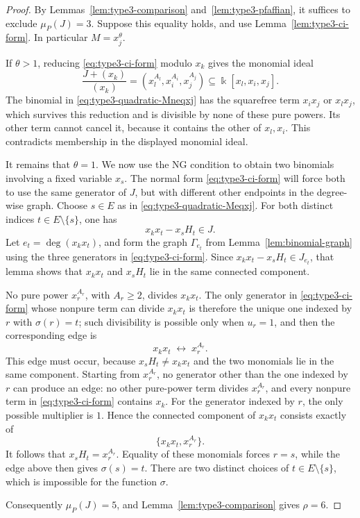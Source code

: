 \documentclass[10pt]{amsart}
\theoremstyle{plain}
\begin{document}
\begin{proof}
By Lemmas~\ref{lem:type3-comparison} and~\ref{lem:type3-pfaffian},
it suffices to exclude \(\mu_P(J)=3\).
Suppose this equality holds, and use
Lemma~\ref{lem:type3-ci-form}.  In particular \(M=x_j^\theta\).

If \(\theta>1\), reducing \eqref{eq:type3-ci-form} modulo \(x_k\)
gives the monomial ideal
\begin{equation*}
\frac{J+(x_k)}{(x_k)}
=(x_l^{A_l},x_i^{A_i},x_j^{A_j})
\subseteq\Bbbk[x_l,x_i,x_j].
\end{equation*}
The binomial in \eqref{eq:type3-quadratic-Mneqxj} has the
squarefree term \(x_ix_j\) or \(x_lx_j\), which survives this
reduction and is divisible by none of these pure powers.
Its other term cannot cancel it, because it contains the other of
\(x_l,x_i\).  This contradicts membership in the displayed monomial
ideal.

It remains that \(\theta=1\).  We now use the NG condition to obtain
two binomials involving a fixed variable \(x_s\).  The normal form
\eqref{eq:type3-ci-form} will force both to use the same generator of
\(J\), but with different other endpoints in the degree-wise graph.
Choose \(s\in E\) as in
\eqref{eq:type3-quadratic-Meqxj}.  For both distinct indices
\(t\in E\setminus\{s\}\), one has
\begin{equation*}
x_kx_t-x_sH_t\in J.
\end{equation*}
Let \(e_t=\deg(x_kx_t)\), and form the graph \(\Gamma_{e_t}\)
from Lemma~\ref{lem:binomial-graph} using the three generators in
\eqref{eq:type3-ci-form}.  Since
\(x_kx_t-x_sH_t\in J_{e_t}\), that lemma shows that
\(x_kx_t\) and \(x_sH_t\) lie in the same connected component.

No pure power \(x_r^{A_r}\), with \(A_r\ge2\), divides \(x_kx_t\).
The only generator in \eqref{eq:type3-ci-form} whose nonpure term can
divide \(x_kx_t\) is therefore the unique one indexed by \(r\) with
\(\sigma(r)=t\); such divisibility is possible only when \(u_r=1\),
and then the corresponding edge is
\[
x_kx_t\;\longleftrightarrow\;x_r^{A_r}.
\]
This edge must occur, because \(x_sH_t\ne x_kx_t\) and the two
monomials lie in the same component.  Starting from
\(x_r^{A_r}\), no generator other than the one indexed by \(r\) can
produce an edge: no other pure-power term divides \(x_r^{A_r}\), and
every nonpure term in \eqref{eq:type3-ci-form} contains \(x_k\).
For the generator indexed by \(r\), the only possible multiplier is
\(1\).  Hence the connected component of \(x_kx_t\) consists exactly
of
\[
\{x_kx_t,x_r^{A_r}\}.
\]
It follows that \(x_sH_t=x_r^{A_r}\).  Equality of these monomials
forces \(r=s\), while the edge above then gives \(\sigma(s)=t\).
There are two distinct choices of \(t\in E\setminus\{s\}\), which is
impossible for the function \(\sigma\).

Consequently \(\mu_P(J)=5\), and
Lemma~\ref{lem:type3-comparison} gives \(\rho=6\).
\end{proof}
\end{document}
